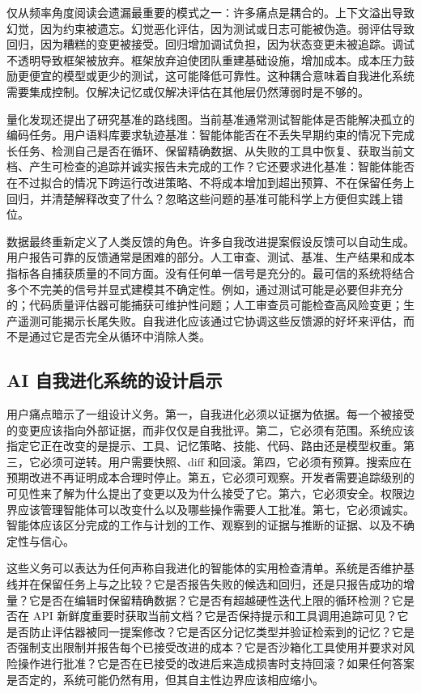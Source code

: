 仅从频率角度阅读会遗漏最重要的模式之一：许多痛点是耦合的。上下文溢出导致幻觉，因为约束被遗忘。幻觉恶化评估，因为测试或日志可能被伪造。弱评估导致回归，因为糟糕的变更被接受。回归增加调试负担，因为状态变更未被追踪。调试不透明导致框架被放弃。框架放弃迫使团队重建基础设施，增加成本。成本压力鼓励更便宜的模型或更少的测试，这可能降低可靠性。这种耦合意味着自我进化系统需要集成控制。仅解决记忆或仅解决评估在其他层仍然薄弱时是不够的。

量化发现还提出了研究基准的路线图。当前基准通常测试智能体是否能解决孤立的编码任务。用户语料库要求轨迹基准：智能体能否在不丢失早期约束的情况下完成长任务、检测自己是否在循环、保留精确数据、从失败的工具中恢复、获取当前文档、产生可检查的追踪并诚实报告未完成的工作？它还要求进化基准：智能体能否在不过拟合的情况下跨运行改进策略、不将成本增加到超出预算、不在保留任务上回归，并清楚解释改变了什么？忽略这些问题的基准可能科学上方便但实践上错位。

数据最终重新定义了人类反馈的角色。许多自我改进提案假设反馈可以自动生成。用户报告可靠的反馈通常是困难的部分。人工审查、测试、基准、生产结果和成本指标各自捕获质量的不同方面。没有任何单一信号是充分的。最可信的系统将结合多个不完美的信号并显式建模其不确定性。例如，通过测试可能是必要但非充分的；代码质量评估器可能捕获可维护性问题；人工审查员可能检查高风险变更；生产遥测可能揭示长尾失败。自我进化应该通过它协调这些反馈源的好坏来评估，而不是通过它是否完全从循环中消除人类。

\subsection{AI 自我进化系统的设计启示}
\label{subsec:design-implications-painpoints}

用户痛点暗示了一组设计义务。第一，自我进化必须以证据为依据。每一个被接受的变更应该指向外部证据，而非仅仅是自我批评。第二，它必须有范围。系统应该指定它正在改变的是提示、工具、记忆策略、技能、代码、路由还是模型权重。第三，它必须可逆转。用户需要快照、diff 和回滚。第四，它必须有预算。搜索应在预期改进不再证明成本合理时停止。第五，它必须可观察。开发者需要追踪级别的可见性来了解为什么提出了变更以及为什么接受了它。第六，它必须安全。权限边界应该管理智能体可以改变什么以及哪些操作需要人工批准。第七，它必须诚实。智能体应该区分完成的工作与计划的工作、观察到的证据与推断的证据、以及不确定性与信心。

这些义务可以表达为任何声称自我进化的智能体的实用检查清单。系统是否维护基线并在保留任务上与之比较？它是否报告失败的候选和回归，还是只报告成功的增量？它是否在编辑时保留精确数据？它是否有超越硬性迭代上限的循环检测？它是否在 API 新鲜度重要时获取当前文档？它是否保持提示和工具调用追踪可见？它是否防止评估器被同一提案修改？它是否区分记忆类型并验证检索到的记忆？它是否强制支出限制并报告每个已接受改进的成本？它是否沙箱化工具使用并要求对风险操作进行批准？它是否在已接受的改进后来造成损害时支持回滚？如果任何答案是否定的，系统可能仍然有用，但其自主性边界应该相应缩小。

